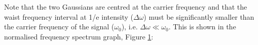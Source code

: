 \documentclass[colorlinks,11pt,a4paper,normalphoto,withhyper,ragged2e]{altareport}
\begin{document}
	\vspace{5mm}
	
	Note that the two Gaussians are centred at the carrier frequency and that the waist frequency interval at 1/e intensity ($\Delta\omega$) must be significantly smaller than the carrier frequency of the signal ($\omega_0$), i.e. ${\Delta\omega}\ll{\omega_0}$. This is shown in the normalised frequency spectrum graph, Figure \ref{fig:gaussian_spectrum_normalised}: \linebreak
	
	\begin{figure}[h]
		\centering
		\scalebox{0.85}{}
		\caption{}
		\label{fig:gaussian_spectrum_normalised}
	\end{figure}
	
	\pagebreak
	
	




\newpage
{}  %


\end{document}
